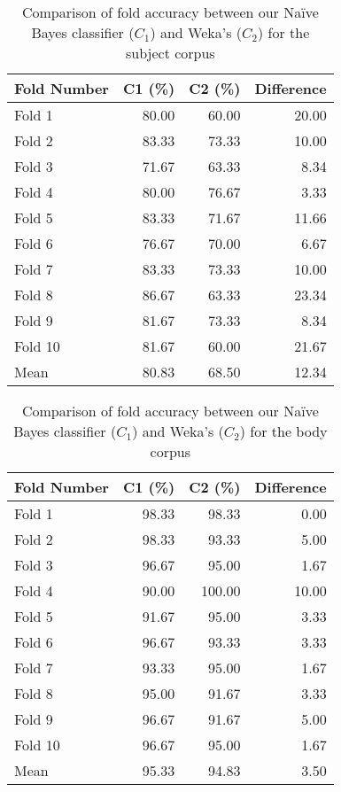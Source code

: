 \documentclass[10pt, a4paper]{article}
\begin{document}
\begin{table}[H]
\centering
\caption{Comparison of fold accuracy between our Na\"ive Bayes classifier ($C_1$) and Weka's ($C_2$) for the subject corpus}
\begin{tabular}{@{}lrrr@{}}
\toprule
\textbf{Fold Number} & \textbf{C1 (\%)} & \textbf{C2 (\%)}
	& \textbf{Difference} \\
\midrule
Fold 1 & 80.00 & 60.00 & 20.00 \\
Fold 2 & 83.33 & 73.33 & 10.00 \\
Fold 3 & 71.67 & 63.33 & 8.34 \\
Fold 4 & 80.00 & 76.67 & 3.33 \\
Fold 5 & 83.33 & 71.67 & 11.66 \\
Fold 6 & 76.67 & 70.00 & 6.67 \\
Fold 7 & 83.33 & 73.33 & 10.00 \\
Fold 8 & 86.67 & 63.33 & 23.34 \\
Fold 9 & 81.67 & 73.33 & 8.34 \\
Fold 10& 81.67 & 60.00 & 21.67 \\
\bottomrule
Mean & 80.83 & 68.50 & 12.34 \\
\bottomrule
\end{tabular}
\label{table:diffsubj}
\end{table}

\begin{table}[H]
\centering
\caption{Comparison of fold accuracy between our Na\"ive Bayes classifier ($C_1$) and Weka's ($C_2$) for the body corpus}
\begin{tabular}{@{}lrrr@{}}
\toprule
\textbf{Fold Number} & \textbf{C1 (\%)} & \textbf{C2 (\%)}
	& \textbf{Difference} \\
\midrule
Fold 1 & 98.33 & 98.33& 0.00 \\
Fold 2 & 98.33 & 93.33 & 5.00 \\
Fold 3 & 96.67 & 95.00 & 1.67 \\
Fold 4 & 90.00 & 100.00 & 10.00 \\
Fold 5 & 91.67 & 95.00 & 3.33 \\
Fold 6 & 96.67 & 93.33 & 3.33 \\
Fold 7 & 93.33 & 95.00 & 1.67 \\
Fold 8 & 95.00 & 91.67 & 3.33 \\
Fold 9 & 96.67 & 91.67 & 5.00 \\
Fold 10 & 96.67 & 95.00 & 1.67 \\
\bottomrule
Mean & 95.33 & 94.83 & 3.50 \\
\bottomrule
\end{tabular}
\label{table:diffbody}
\end{table}
\end{document}
